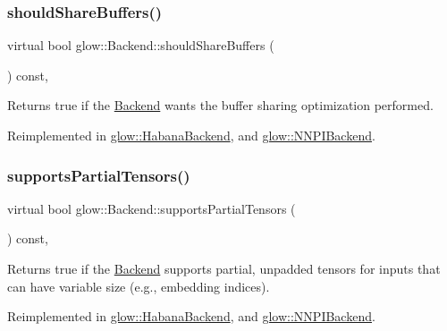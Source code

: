 \subsubsection{\texorpdfstring{should\+Share\+Buffers()}{shouldShareBuffers()}}
{\footnotesize\ttfamily virtual bool glow\+::\+Backend\+::should\+Share\+Buffers (\begin{DoxyParamCaption}{ }\end{DoxyParamCaption}) const\hspace{0.3cm}{\ttfamily [inline]}, {\ttfamily [virtual]}}

\begin{DoxyReturn}{Returns}
true if the \hyperlink{classglow_1_1_backend}{Backend} wants the buffer sharing optimization performed. 
\end{DoxyReturn}


Reimplemented in \hyperlink{classglow_1_1_habana_backend_a15199d7d7f6890963f2b8471095d0145}{glow\+::\+Habana\+Backend}, and \hyperlink{classglow_1_1_n_n_p_i_backend_ae831e2d887416d5ee461f1b898230b66}{glow\+::\+N\+N\+P\+I\+Backend}.

\mbox{\label{classglow_1_1_backend_a930556ce803696ca2ffe8d66c9ba5401}} 
\subsubsection{\texorpdfstring{supports\+Partial\+Tensors()}{supportsPartialTensors()}}
{\footnotesize\ttfamily virtual bool glow\+::\+Backend\+::supports\+Partial\+Tensors (\begin{DoxyParamCaption}{ }\end{DoxyParamCaption}) const\hspace{0.3cm}{\ttfamily [inline]}, {\ttfamily [virtual]}}

\begin{DoxyReturn}{Returns}
true if the \hyperlink{classglow_1_1_backend}{Backend} supports partial, unpadded tensors for inputs that can have variable size (e.\+g., embedding indices). 
\end{DoxyReturn}


Reimplemented in \hyperlink{classglow_1_1_habana_backend_ac6a97ec29cff4ba43e1d459450e9d175}{glow\+::\+Habana\+Backend}, and \hyperlink{classglow_1_1_n_n_p_i_backend_a83a437d7624740427aa1aa650e381576}{glow\+::\+N\+N\+P\+I\+Backend}.


